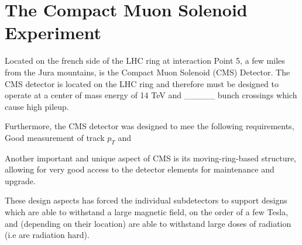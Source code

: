 \chapter{The Compact Muon Solenoid Experiment}
Located on the french side of the LHC ring at interaction Point 5, a few miles from the 
Jura mountains, is the Compact Muon Solenoid (CMS) Detector. 
The CMS detector is located on the LHC ring and therefore must be designed to
operate at %
a center of mass energy of 14 TeV and _____ bunch crossings which cause high pileup.

Furthermore, the CMS detector was designed to mee the following requirements,
Good measurement of track $p_T$ and 

Another important and unique aspect of CMS is its moving-ring-based structure,
allowing for very good access to the detector elements for maintenance and upgrade.

These design aspects has forced the individual subdetectors to support designs which
are able to withstand a large magnetic field, on the order of a few Tesla, and (depending on their location)
are able to withstand large doses of radiation (i.e are radiation hard). 
